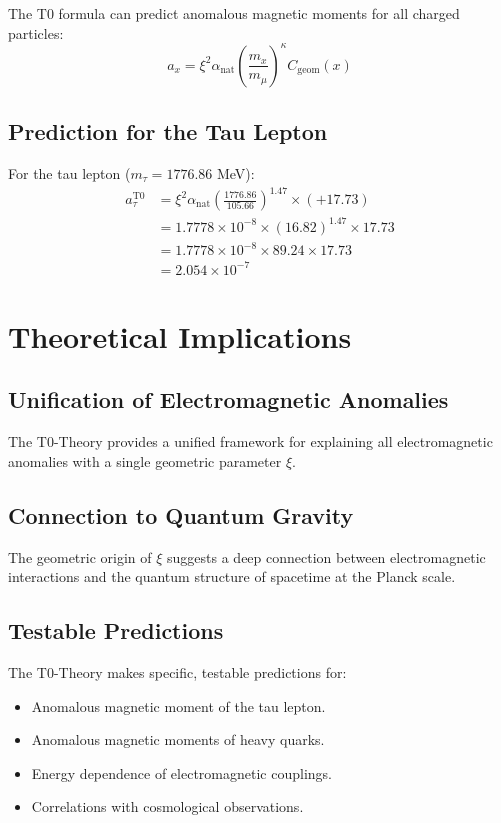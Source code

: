 \documentclass[12pt,a4paper]{article}
\newcommand{\xipar}{\xi}
\newcommand{\alphaNAT}{\alpha_{\text{nat}}}
\newcommand{\Cgeom}{C_{\text{geom}}}
\newcommand{\kappaT}{\kappa}
\newcommand{\mmu}{m_{\mu}}
\begin{document}
	The T0 formula can predict anomalous magnetic moments for all charged particles:
	\begin{equation}
		a_x = \xipar^2 \alphaNAT \left(\frac{m_x}{\mmu}\right)^{\kappaT} \Cgeom(x)
	\end{equation}
	
	\subsection{Prediction for the Tau Lepton}
	
	For the tau lepton (\( m_\tau = 1776.86 \) MeV):
	\begin{align}
		a_\tau^{\text{T0}} &= \xipar^2 \alphaNAT \left(\frac{1776.86}{105.66}\right)^{1.47} \times (+17.73) \\
		&= 1.7778 \times 10^{-8} \times (16.82)^{1.47} \times 17.73 \\
		&= 1.7778 \times 10^{-8} \times 89.24 \times 17.73 \\
		&= 2.054 \times 10^{-7}
	\end{align}
	
	\section{Theoretical Implications}
	
	\subsection{Unification of Electromagnetic Anomalies}
	
	The T0-Theory provides a unified framework for explaining all electromagnetic anomalies with a single geometric parameter \(\xipar\).
	
	\subsection{Connection to Quantum Gravity}
	
	The geometric origin of \(\xipar\) suggests a deep connection between electromagnetic interactions and the quantum structure of spacetime at the Planck scale.
	
	\subsection{Testable Predictions}
	
	The T0-Theory makes specific, testable predictions for:
	\begin{itemize}
		\item Anomalous magnetic moment of the tau lepton.
		\item Anomalous magnetic moments of heavy quarks.
		\item Energy dependence of electromagnetic couplings.
		\item Correlations with cosmological observations.
	\end{itemize}
	
\end{document}

